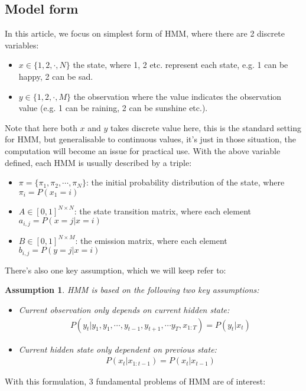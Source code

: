 \documentclass{article} [10pt] %
\newtheorem{asmp}{Assumption}
\begin{document}
\subsection{Model form}
In this article, we focus on simplest form of HMM, where there are 2 discrete variables: 
\begin{itemize}
	\item $x\in \{1, 2,\cdot, N\}$ the state, where 1, 2 etc. represent each state, e.g. 1 can be happy, 2 can be sad.
	\item $y\in \{1, 2,\cdot, M\}$ the observation where the value indicates the observation value (e.g. 1 can be raining, 2 can be sunshine etc.).
\end{itemize}
Note that here both $x$ and $y$ takes discrete value here, this is the standard setting for HMM, but generalisable to continuous values, it's just in those situation, the computation will become an issue for practical use. With the above variable defined, each HMM is usually described by a triple:
\begin{itemize}
	\item $\pi=\{\pi_1, \pi_2,\cdots, \pi_N\}$: the initial probability distribution of the state, where $\pi_i=P(x_1=i)$
	\item $A\in[0, 1]^{N\times N}$: the state transition matrix, where each element $a_{i,j} = P(x=j|x=i)$
	\item $B\in[0, 1]^{N\times M}$: the emission matrix, where each element $b_{i, j} = P(y=j|x=i)$
\end{itemize}
There's also one key assumption, which we will keep refer to:
\begin{asmp} \label{asmp:hmm_assumptions}
	HMM is based on the following two key assumptions:
	\begin{itemize}
		\item Current observation only depends on current hidden state:
		\begin{align}P(y_t|y_1,y_1, \cdots,y_{t-1}, y_{t+1},\cdots y_T,x_{1:T})= P(y_t|x_t)\end{align}
		\item Current hidden state only dependent on previous state:
		\begin{align}P(x_t|x_{1:t-1})= P(x_t|x_{t-1})\end{align}
	\end{itemize}
\end{asmp}
With this formulation, 3 fundamental problems of HMM are of interest:
\end{document}

